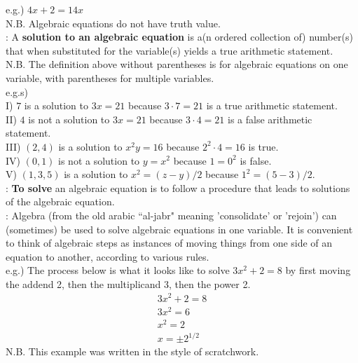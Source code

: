 \documentclass[12pt]{article}
\def\bea{\begin{eqnarray}}
\def\eea{\end{eqnarray}}
\def\nn{\nonumber}
\def\ni{\noindent}
\begin{document}
\ni e.g.) $4x+2=14x$\\

\ni N.B. Algebraic equations do not have truth value.\\

 \ni {\bfseries Definition}:
 A {\bfseries solution to an algebraic equation} is a(n ordered collection of) number(s) that when substituted for the variable(s) yields a true arithmetic statement.\\
 
 \ni N.B. The definition above without parentheses is for algebraic equations on one variable, with parentheses for multiple variables. \\
 
\ni  e.g.s) \\
I) $7$ is a solution to $3x=21$ because $3\cdot7=21$ is a true arithmetic statement.\\
 II) $4$ is not a solution to $3x=21$ because $3\cdot4=21$ is a false arithmetic statement.\\
 III) $(2,4)$ is a solution to $x^2y=16$ because $2^2\cdot4=16$ is true.\\
 IV) $(0,1)$ is not a solution to $y=x^2$ because $1=0^2$ is false. \\ 
 V) $(1,3,5)$ is  a solution to $x^2=(z-y)/2$ because $1^2=(5-3)/2$. \\ 

%
 \ni {\bfseries Definition}:
{\bfseries To solve} an algebraic equation is to follow a procedure that leads to solutions of the algebraic equation.\\



\ni {\bfseries Recall}: Algebra (from the old arabic ``al-jabr" meaning 'consolidate' or 'rejoin') can (sometimes) be used to solve algebraic equations in one variable. It is convenient to think of algebraic steps as instances of moving things from one side of an equation to another, according to various rules.\\

\ni e.g.) The process below is what it looks like to solve $3x^2+2=8$ by first moving the addend 2, then the multiplicand 3, then the power 2.
\bea \nn
3x^2+2=8\\ \nn
3x^2=6\\ \nn
x^2=2 \\ \nn
x=\pm 2^{1/2}
\eea
N.B. This example was written in the style of scratchwork.\\
\end{document}
